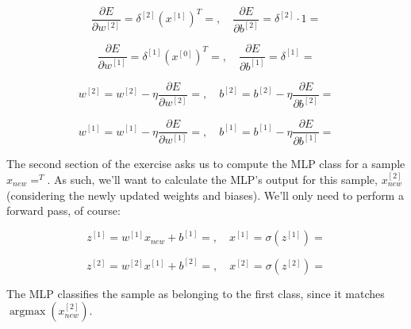 \documentclass[12pt]{article}
\begin{document}
\begin{enumerate}[leftmargin=\labelsep]
  \begin{equation*}
    \frac{\partial E}{\partial w^{[2]}} = \delta^{[2]} (x^{[1]})^T = , \quad
    \frac{\partial E}{\partial b^{[2]}} = \delta^{[2]} \cdot 1 = 
  \end{equation*}

  \begin{equation*}
    \frac{\partial E}{\partial w^{[1]}} = \delta^{[1]} (x^{[0]})^T = , \quad
    \frac{\partial E}{\partial b^{[1]}} = \delta^{[1]} = 
  \end{equation*}

  \begin{equation*}
    w^{[2]} = w^{[2]} - \eta \frac{\partial E}{\partial w^{[2]}} = , \quad
    b^{[2]} = b^{[2]} - \eta \frac{\partial E}{\partial b^{[2]}} = 
  \end{equation*}

  \begin{equation*}
    w^{[1]} = w^{[1]} - \eta \frac{\partial E}{\partial w^{[1]}} = , \quad
    b^{[1]} = b^{[1]} - \eta \frac{\partial E}{\partial b^{[1]}} = 
  \end{equation*}

  \pagebreak

  The second section of the exercise asks us to compute the MLP class for a sample
  $x_{new} = ^T$. As such, we'll want to calculate
  the MLP's output for this sample, $x^{[2]}_{new}$ (considering the newly updated
  weights and biases). We'll only need to perform a forward pass, of course:

  \begin{equation*}
    z^{[1]} = w^{[1]} x_{new} + b^{[1]} = , \quad
    x^{[1]} = \sigma(z^{[1]}) = 
  \end{equation*}

  \begin{equation*}
    z^{[2]} = w^{[2]} x^{[1]} + b^{[2]} = , \quad
    x^{[2]} = \sigma(z^{[2]}) = 
  \end{equation*}

  The MLP classifies the sample as belonging to the first class, since
  it matches $\operatorname{argmax}(x^{[2]}_{new})$.


\end{enumerate}
\end{document}
